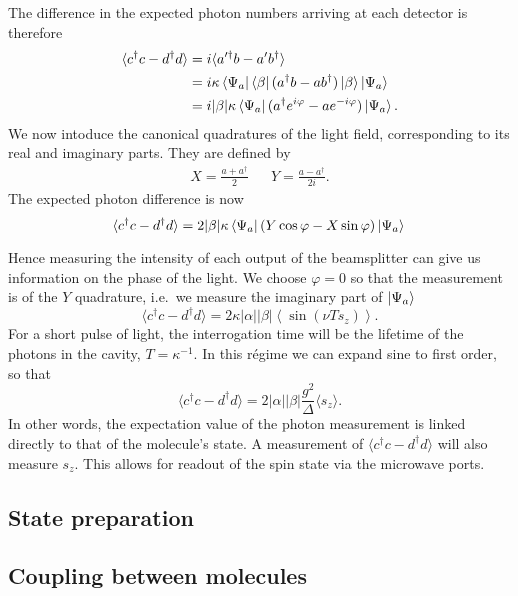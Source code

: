 The difference in the expected photon numbers arriving at each
detector is therefore
%
\begin{align}
  \langle c^\dagger c - d^\dagger d\rangle &= i\langle a'^\dagger b-
  a'b^\dagger \rangle \\
  &= i \kappa \bra{\Psi_a}\bra{\beta}(a^\dagger b-
  ab^\dagger)\ket{\beta}\ket{\Psi_a} \\
  & = i|\beta|\kappa \bra{\Psi_a}(a^\dagger e^{i\varphi} - a
  e^{-i\varphi})\ket{\Psi_a}.
\end{align}
%
We now intoduce the canonical quadratures of the light field, corresponding to
its real and imaginary parts. They are defined by~\cite{gerry_knight_2004}
%
\begin{align}
  X = \frac{a + a^\dagger}{2} && Y = \frac{a - a^\dagger}{2i}.
\end{align}
%
The expected photon difference is now
\begin{equation}
  \langle c^\dagger c - d^\dagger d\rangle =
  2|\beta|\kappa\bra{\Psi_a}(Y\cos\varphi - X\sin\varphi)\ket{\Psi_a} \\
  \label{squeeze:eqn:homoquads}
\end{equation}

Hence measuring the intensity of each output of the beamsplitter can give us
information on the phase of the light. We choose $\varphi = 0$ so that the
measurement is of the $Y$ quadrature, i.e.\ we measure the imaginary part of
$\ket{\Psi_a}$
%
\begin{equation}
  \langle c^\dagger c - d^\dagger d\rangle =  2\kappa
  |\alpha||\beta|\left\langle\sin(\nu T s_z)\right\rangle.
\end{equation}
%
For a short pulse of light, the interrogation time will be the lifetime of the
photons in the cavity, $T = \kappa^{-1}$. In this r\'egime we can expand sine
to first order, so that
%
\begin{equation}
  \langle c^\dagger c - d^\dagger d\rangle = 2|\alpha||\beta|
  \frac{g^2}{\Delta}\langle s_z\rangle.
  \label{eqn:homomeas}
\end{equation}
%
In other words, the expectation value of the photon measurement is linked
directly to that of the molecule's state. A measurement of $\langle c^\dagger c
- d^\dagger d\rangle$ will also measure $s_z$. This allows for readout of the
spin state via the microwave ports.


\subsection{State preparation}



\subsection{Coupling between molecules}



